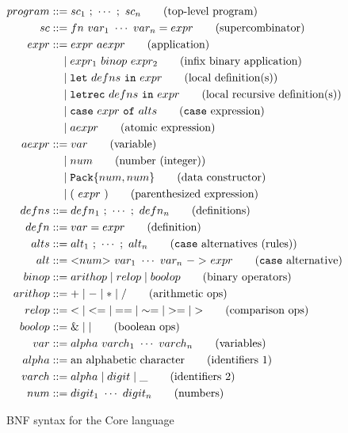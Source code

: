 \begin{figure}
  \centering
  \begin{align*}
    program & ::= sc_1\ ;\ \cdots\ ;\ sc_n\tag{top-level program} \\
    sc & ::= fn\ var_1\ \cdots\ var_n = expr\tag{supercombinator} \\
    expr & ::= expr\ aexpr\tag{application} \\
            & \ \ \ \mid expr_1\ binop\ expr_2\tag{infix binary application} \\
            & \ \ \ \mid \mathtt{let}\ defns\ \mathtt{in}\ expr\tag{local definition(s)} \\
            & \ \ \ \mid \mathtt{letrec}\ defns\ \mathtt{in}\ expr\tag{local recursive definition(s)} \\
            & \ \ \ \mid \mathtt{case}\ expr\ \mathtt{of}\ alts\tag{\texttt{case} expression} \\
            & \ \ \ \mid aexpr\tag{atomic expression} \\
    aexpr & ::= var\tag{variable} \\
            & \ \ \ \mid num\tag{number (integer)} \\
            & \ \ \ \mid \mathtt{Pack\{}num,num\mathtt{\}}\tag{data constructor} \\
            & \ \ \ \mid (\ expr\ )\tag{parenthesized expression} \\
    defns & ::= defn_1\ ;\ \cdots\ ;\ defn_n\tag{definitions} \\
    defn & ::= var=expr\tag{definition} \\
    alts & ::= alt_1\ ;\ \cdots\ ;\ alt_n\tag{\texttt{case} alternatives (rules)} \\
    alt & ::= \mathtt{<} num \mathtt{>}\ var_1\ \cdots\ var_n\ \mathtt{->}\ expr\tag{\texttt{case} alternative} \\
    binop & ::= arithop \mid relop \mid boolop\tag{binary operators} \\
    arithop & ::= \mathtt{+} \mid \mathtt{-} \mid \mathtt{*} \mid \mathtt{/}\tag{arithmetic ops} \\
    relop & ::= \mathtt{<} \mid \mathtt{<=} \mid \mathtt{==} \mid \mathtt{\sim=} \mid \mathtt{>=} \mid \mathtt{>}\tag{comparison ops} \\
    boolop & ::= \mathtt{\&} \mid \mathtt{|}\tag{boolean ops} \\
    var & ::= alpha\ varch_1\ \cdots\ varch_n\tag{variables} \\
    alpha & ::= \text{an alphabetic character}\tag{identifiers 1} \\
    varch & ::= alpha\mid digit\mid \_\tag{identifiers 2} \\
    num & ::= digit_1\ \cdots\ digit_n\tag{numbers}
  \end{align*}
  \caption{BNF syntax for the Core language}
  \label{fig:core-syntax}
\end{figure}

